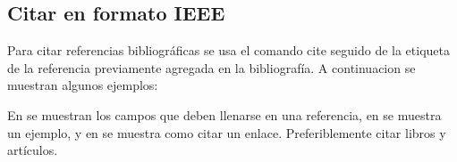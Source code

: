 \subsection{Citar en formato IEEE}
Para citar referencias bibliográficas se usa el comando cite seguido de la etiqueta de la referencia previamente agregada en la bibliografía. A continuacion se muestran algunos ejemplos:

En \cite{nombre_para_citar} se muestran los campos que deben llenarse en una referencia, en \cite{kopka} se muestra un ejemplo, y en \cite{link} se muestra como citar un enlace. Preferiblemente citar libros y artículos.



